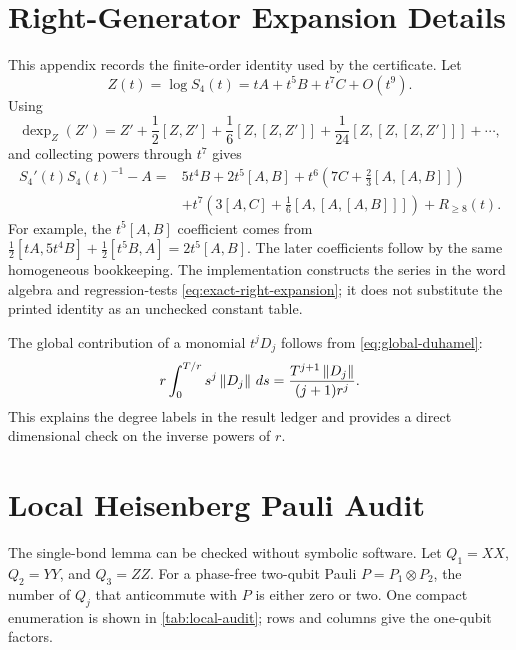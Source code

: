 \section{Right-Generator Expansion Details}
\label{app:right-generator}

This appendix records the finite-order identity used by the certificate.  Let
\begin{equation}
 Z(t)=\log S_4(t)=tA+t^5B+t^7C+O(t^9).
\end{equation}
Using
\begin{equation}
 \operatorname{dexp}_{Z}(Z')=
 Z'+\frac12[Z,Z']+\frac16[Z,[Z,Z']]
 +\frac1{24}[Z,[Z,[Z,Z']]]+\cdots,
\end{equation}
and collecting powers through $t^7$ gives
\begin{align}
 S_4'(t)S_4(t)^{-1}-A
  ={}&5t^4B+2t^5[A,B]
  +t^6\left(7C+\frac23[A,[A,B]]\right)\nonumber\\
  &+t^7\left(3[A,C]+\frac16[A,[A,[A,B]]]\right)
  +R_{\geq8}(t).
 \label{eq:exact-right-expansion}
\end{align}
For example, the $t^5[A,B]$ coefficient comes from
$\frac12[tA,5t^4B]+\frac12[t^5B,A]=2t^5[A,B]$.
The later coefficients follow by the same homogeneous bookkeeping.  The
implementation constructs the series in the word algebra and regression-tests
\cref{eq:exact-right-expansion}; it does not substitute the printed identity
as an unchecked constant table.

The global contribution of a monomial $t^jD_j$ follows from
\cref{eq:global-duhamel}:
\begin{equation}
 r\int_0^{T/r}s^j\left\lVert D_j\right\rVert\,ds
 =\frac{T^{j+1}\left\lVert D_j\right\rVert}{(j+1)r^j}.
 \label{eq:monomial-global}
\end{equation}
This explains the degree labels in the result ledger and provides a direct
dimensional check on the inverse powers of $r$.

\section{Local Heisenberg Pauli Audit}
\label{app:local-pauli}

The single-bond lemma can be checked without symbolic software.  Let
$Q_1=XX$, $Q_2=YY$, and $Q_3=ZZ$.  For a phase-free two-qubit Pauli
$P=P_1\otimes P_2$, the number of $Q_j$ that anticommute with $P$ is either
zero or two.  One compact enumeration is shown in \cref{tab:local-audit}; rows
and columns give the one-qubit factors.

